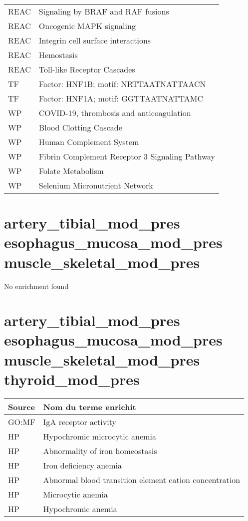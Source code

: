 \begin{longtable}{ll}
REAC & Signaling by BRAF and RAF fusions\\
REAC & Oncogenic MAPK signaling\\
REAC & Integrin cell surface interactions\\
REAC & Hemostasis\\
REAC & Toll-like Receptor Cascades\\
TF & Factor: HNF1B; motif: NRTTAATNATTAACN\\
TF & Factor: HNF1A; motif: GGTTAATNATTAMC\\
WP & COVID-19, thrombosis and anticoagulation\\
WP & Blood Clotting Cascade\\
WP & Human Complement System\\
WP & Fibrin Complement Receptor 3 Signaling Pathway\\
WP & Folate Metabolism\\
WP & Selenium Micronutrient Network\\
\bottomrule
\end{longtable}

\section*{artery\_tibial\_mod\_pres \newline esophagus\_mucosa\_mod\_pres \newline muscle\_skeletal\_mod\_pres}
No enrichment found

\section*{artery\_tibial\_mod\_pres \newline esophagus\_mucosa\_mod\_pres \newline muscle\_skeletal\_mod\_pres \newline thyroid\_mod\_pres}

\begin{longtable}{ll}
\toprule
Source & Nom du terme enrichit\\
\midrule
GO:MF & IgA receptor activity\\
HP & Hypochromic microcytic anemia\\
HP & Abnormality of iron homeostasis\\
HP & Iron deficiency anemia\\
HP & Abnormal blood transition element cation concentration\\
HP & Microcytic anemia\\
HP & Hypochromic anemia\\
\bottomrule
\end{longtable}

